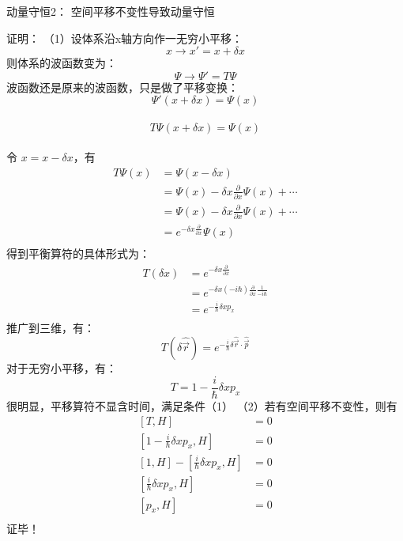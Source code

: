 \begin{frame} [allowframebreaks=]
    \frametitle{} 
    \begin{tcolorbox1}{动量守恒2：}
        空间平移不变性导致动量守恒                                
    \end{tcolorbox1}
    \alert{证明：} （1）设体系沿x轴方向作一无穷小平移：
    $$ x \to x'=x+\delta x $$
    则体系的波函数变为：
    $$ \Psi \to \Psi'=T\Psi  $$
    波函数还是原来的波函数，只是做了平移变换： $$ \Psi'(x+\delta x) = \Psi(x) $$\\
    $$ T\Psi(x+\delta x) = \Psi(x) $$\\
    令 $x=x-\delta x$，有
    $$\begin{aligned}
        T\Psi(x)&= \Psi(x-\delta x) \\
        &= \Psi(x)-\delta x \frac{\partial}{\partial x}\Psi(x)+\cdots\\
        &= \Psi(x)-\delta x \frac{\partial}{\partial x}\Psi(x)+\cdots\\
        &= e^{-\delta x \frac{\partial}{\partial x}} \Psi(x)\\
    \end{aligned}$$
    得到平衡算符的具体形式为：
    $$\begin{aligned}
        T(\delta x)&= e^{-\delta x \frac{\partial}{\partial x}} \\
        &= e^{-\delta x (-i\hbar) \frac{\partial}{\partial x}\frac{1}{-i\hbar}} \\
        &= e^{-\frac{i}{\hbar}\delta x p_x } \\
    \end{aligned}$$
    推广到三维，有：
    $$ T(\delta \hat{\vec{r}})= e^{-\frac{i}{\hbar}\delta \hat{\vec{r}}\cdot \hat{\vec{p}} }  $$ 
    对于无穷小平移，有：
    $$T=1-\frac{i}{\hbar}\delta x p_x$$
    很明显，平移算符不显含时间，满足条件（1）
    （2）若有空间平移不变性，则有
    $$\begin{aligned}
        [T,H]&= 0 \\
        [1-\frac{i}{\hbar}\delta x p_x, H] &=0 \\
        [1, H]-[\frac{i}{\hbar}\delta x p_x, H]&=0 \\
        [\frac{i}{\hbar}\delta x p_x, H]&=0 \\
        [p_x, H] &=0 \\
    \end{aligned}$$
    证毕！
\end{frame}

